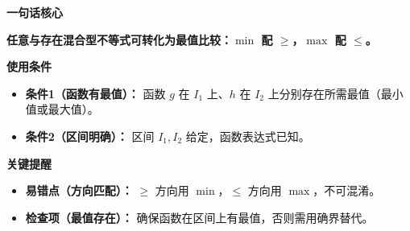 \begin{summarybox}
	\textbf{\textcolor{CSummary}{一句话核心}}

	\textbf{任意与存在混合型不等式可转化为最值比较：$\min$ 配 $\ge$，$\max$ 配 $\le$。}

	\medskip
	\textbf{\textcolor{CSummary}{使用条件}}
	\begin{itemize}[leftmargin=*, itemsep=0.5em, topsep=0.4em]
		\item \textbf{条件1（函数有最值）：} 函数 $g$ 在 $I_1$ 上、$h$ 在 $I_2$ 上分别存在所需最值（最小值或最大值）。
		\item \textbf{条件2（区间明确）：} 区间 $I_1,I_2$ 给定，函数表达式已知。
	\end{itemize}

	\medskip
	\textbf{\textcolor{CSummary}{关键提醒}}
	\begin{itemize}[leftmargin=*, itemsep=0.5em, topsep=0.4em]
		\item \textbf{易错点（方向匹配）：} $\ge$ 方向用 $\min$，$\le$ 方向用 $\max$，不可混淆。
		\item \textbf{检查项（最值存在）：} 确保函数在区间上有最值，否则需用确界替代。
	\end{itemize}
\end{summarybox}
